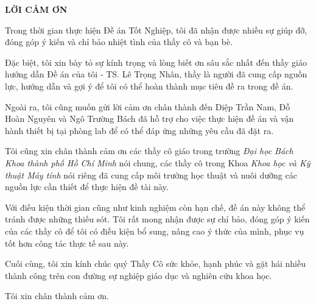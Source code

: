 \vspace*{0.5cm}
\begin{center}
    \textbf{LỜI CẢM ƠN}
\end{center}

Trong thời gian thực hiện Đề án Tốt Nghiệp, tôi đã nhận được nhiều sự giúp đỡ, đóng góp ý kiến và chỉ bảo nhiệt tình của thầy cô và bạn bè.

Đặc biệt, tôi xin bày tỏ sự kính trọng và lòng biết ơn sâu sắc nhất đến thầy giáo hướng dẫn Đề án của tôi - TS. Lê Trọng Nhân, thầy là người đã cung cấp nguồn lực, hướng dẫn và gợi ý để tôi có thể hoàn thành mục tiêu đề ra trong đề án.

Ngoài ra, tôi cũng muốn gửi lời cảm ơn chân thành đến Diệp Trần Nam, Đỗ Hoàn Nguyên và Ngô Trường Bách đã hỗ trợ cho việc thực hiện đề án và vận hành thiết bị tại phòng lab để có thể đáp ứng những yêu cầu đã đặt ra.

Tôi cũng xin chân thành cảm ơn các thầy cô giáo trong trường \textit{Đại học Bách Khoa thành phố Hồ Chí Minh} nói chung, các thầy cô trong Khoa \textit{Khoa học và Kỹ thuật Máy tính} nói riêng đã cung cấp môi trường học thuật và nuôi dưỡng các nguồn lực cần thiết để thực hiện đề tài này.

Với điều kiện thời gian cũng như kinh nghiệm còn hạn chế, đề án này không thể tránh được những thiếu sót. Tôi rất mong nhận được sự chỉ bảo, đóng góp ý kiến của các thầy cô để tôi có điều kiện bổ sung, nâng cao ý thức của mình, phục vụ tốt hơn công tác thực tế sau này.

Cuối cùng, tôi xin kính chúc quý Thầy Cô sức khỏe, hạnh phúc và gặt hái nhiều thành công trên con đường sự nghiệp giáo dục và nghiên cứu khoa học.

Tôi xin chân thành cảm ơn.




